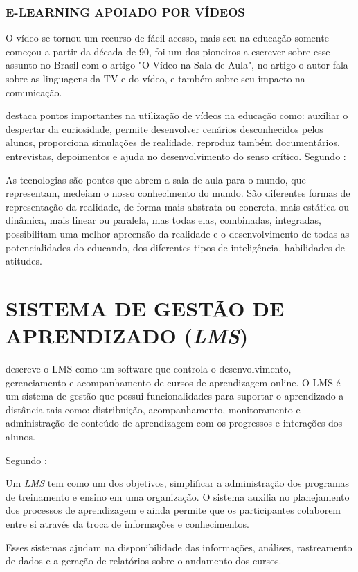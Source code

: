 \subsubsection{E-LEARNING APOIADO POR VÍDEOS}
O vídeo se tornou um recurso de fácil acesso, mais seu na educação somente começou a partir da década de 90,  foi um dos pioneiros a escrever sobre esse assunto no Brasil com o artigo "O Vídeo na Sala de Aula", no artigo o autor fala sobre as linguagens da TV e do vídeo, e também sobre seu impacto na comunicação.
\par
{} destaca pontos importantes na utilização de vídeos na educação como: auxiliar o despertar da curiosidade, permite desenvolver cenários desconhecidos pelos alunos, proporciona simulações de realidade, reproduz também documentários, entrevistas, depoimentos e ajuda no desenvolvimento do senso crítico. Segundo :
\begin{citacao}
  As tecnologias são pontes que abrem a sala de aula para o mundo, que representam, medeiam o nosso conhecimento do mundo. São diferentes formas de representação da realidade, de forma mais abstrata ou concreta, mais estática ou dinâmica, mais linear ou paralela, mas todas elas, combinadas, integradas, possibilitam uma melhor apreensão da realidade e o desenvolvimento de todas as potencialidades do educando, dos diferentes tipos de inteligência, habilidades de atitudes.
\end{citacao}

\section{SISTEMA DE GESTÃO DE APRENDIZADO (\textit{LMS})}

 descreve o \ac{LMS} como um software que controla o desenvolvimento, gerenciamento e acompanhamento de cursos de aprendizagem online. O \ac{LMS} é um sistema de gestão que possui funcionalidades para suportar o aprendizado a distância tais como: distribuição, acompanhamento, monitoramento e administração de conteúdo de aprendizagem com os progressos e interações dos alunos.
\par
Segundo :
\begin{citacao}
  Um \textit{LMS} tem como um dos objetivos, simplificar a administração dos programas de treinamento e ensino em uma organização. O sistema auxilia no planejamento dos processos de aprendizagem e ainda permite que os participantes colaborem entre si através da troca de informações e conhecimentos.
\end{citacao}
\par
Esses sistemas ajudam na disponibilidade das informações, análises, rastreamento de dados e a geração de relatórios sobre o andamento dos cursos.

